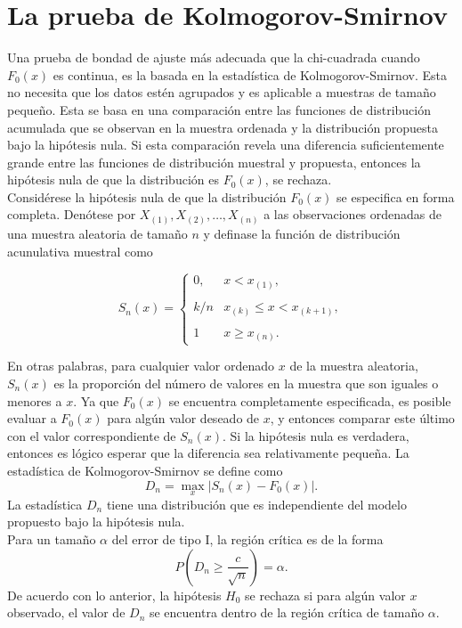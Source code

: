 \section{La prueba de Kolmogorov-Smirnov}
Una prueba de bondad de ajuste más adecuada que la chi-cuadrada cuando $F_0(x)$ es continua, es la basada en la estadística de Kolmogorov-Smirnov. Esta no necesita que los datos estén agrupados y es aplicable a muestras de tamaño pequeño. Esta se basa en una comparación entre las funciones de distribución acumulada que se observan en la muestra ordenada y la distribución propuesta bajo la hipótesis nula. Si esta comparación revela una diferencia suficientemente grande entre las funciones de distribución muestral y propuesta, entonces la hipótesis nula de que la distribución es $F_0(x)$, se rechaza.\\

Considérese la hipótesis nula de que la distribución $F_0(x)$ se especifica en forma completa. Denótese por $X_{(1)}, X_{(2)},\ldots,X_{(n)}$ a las observaciones ordenadas de una muestra aleatoria de tamaño $n$ y definase la función de distribución acunulativa muestral como

$$
S_n(x)=
    \left\{
	\begin{array}{ll}
	    0, & x<x_{(1)},\\\\
	    k/n & x_{(k)}\leq x < x_{(k+1)},\\\\
	    1 & x\geq x_{(n)}.
	\end{array}
    \right.
$$

En otras palabras, para cualquier valor ordenado $x$ de la muestra aleatoria, $S_n(x)$ es la proporción del número de valores en la muestra que son iguales o menores a $x$. Ya que $F_0(x)$ se encuentra completamente especificada, es posible evaluar a $F_0(x)$ para algún valor deseado de $x$, y entonces comparar este último con el valor correspondiente de $S_n(x)$. Si la hipótesis nula es verdadera, entonces es lógico esperar que la diferencia sea relativamente pequeña. La estadística de Kolmogorov-Smirnov se define como
$$D_n=\max_x|S_n(x)-F_0(x)|.$$
La estadística $D_n$ tiene una distribución que es independiente del modelo propuesto bajo la hipótesis nula. \\

Para un tamaño $\alpha$ del error de tipo I, la región crítica es de la forma
$$P\left(D_n\geq \dfrac{c}{\sqrt{n}}\right)=\alpha.$$
De acuerdo con lo anterior, la hipótesis $H_0$ se rechaza si para algún valor $x$ observado, el valor de $D_n$ se encuentra dentro de la región crítica de tamaño $\alpha$.
